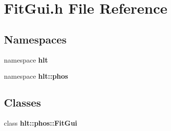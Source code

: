 \section{Fit\-Gui.h File Reference}
\label{FitGui_8h}
\subsection*{Namespaces}
\begin{CompactItemize}
\item 
namespace {\bf hlt}
\item 
namespace {\bf hlt::phos}
\end{CompactItemize}
\subsection*{Classes}
\begin{CompactItemize}
\item 
class {\bf hlt::phos::Fit\-Gui}
\end{CompactItemize}
